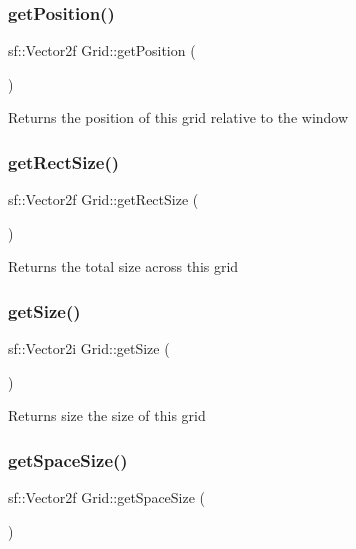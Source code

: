 \subsubsection{\texorpdfstring{get\+Position()}{getPosition()}}
{\footnotesize\ttfamily sf\+::\+Vector2f Grid\+::get\+Position (\begin{DoxyParamCaption}{ }\end{DoxyParamCaption})}

\begin{DoxyReturn}{Returns}
the position of this grid relative to the window 
\end{DoxyReturn}
\mbox{\label{classGrid_ac1bef10cb20d82aac5caebdd08fc5900}} 
\subsubsection{\texorpdfstring{get\+Rect\+Size()}{getRectSize()}}
{\footnotesize\ttfamily sf\+::\+Vector2f Grid\+::get\+Rect\+Size (\begin{DoxyParamCaption}{ }\end{DoxyParamCaption})}

\begin{DoxyReturn}{Returns}
the total size across this grid 
\end{DoxyReturn}
\mbox{\label{classGrid_aee705a327a063ddd21d70075fcfa28a5}} 
\subsubsection{\texorpdfstring{get\+Size()}{getSize()}}
{\footnotesize\ttfamily sf\+::\+Vector2i Grid\+::get\+Size (\begin{DoxyParamCaption}{ }\end{DoxyParamCaption})}

\begin{DoxyReturn}{Returns}
size the size of this grid 
\end{DoxyReturn}
\mbox{\label{classGrid_aab378faa1bf9567a00d871a26ecf818a}} 
\subsubsection{\texorpdfstring{get\+Space\+Size()}{getSpaceSize()}}
{\footnotesize\ttfamily sf\+::\+Vector2f Grid\+::get\+Space\+Size (\begin{DoxyParamCaption}{ }\end{DoxyParamCaption})}

